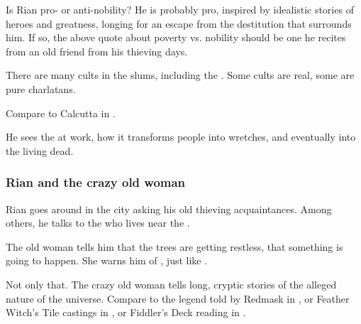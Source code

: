 \begin{garbage}
Is Rian pro- or anti-nobility? He is probably pro, inspired by idealistic stories of heroes and greatness, longing for an escape from the destitution that surrounds him. If so, the above quote about poverty vs. nobility should be one he recites from an old friend from his thieving days. 

There are many cults in the slums, including the . Some cults are real, some are pure charlatans. 

Compare to Calcutta in \cite{PoppyZBrite:CalcuttaLordofNerves}. 

He sees the \hs{\Morbus} at work, how it transforms people into wretches, and eventually into the living dead. 





\subsubsection{Rian and the crazy old woman}
Rian goes around in the city asking his old thieving acquaintances. Among others, he talks to the  who lives near the . 

The old woman tells him that the trees are getting restless, that something is going to happen. She warns him of , just like . 


Not only that. The crazy old woman tells long, cryptic stories of the alleged nature of the universe. Compare to the legend told by Redmask in \cite[p.340]{StevenErikson:ReapersGale}, or Feather Witch's Tile castings in \cite{StevenErikson:MidnightTides}, or Fiddler's Deck reading in \cite{StevenErikson:TheBonehunters}.







\end{garbage}

